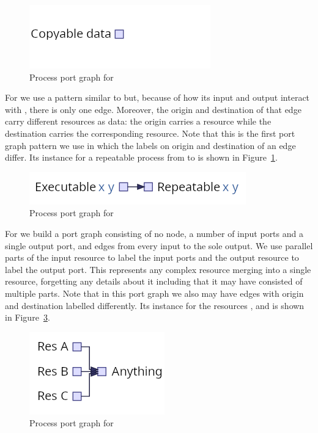 \documentclass[class=smolathesis,crop=false]{standalone}
\begin{document}
\begin{figure}[htbp]
  \centering
  \includegraphics[scale=0.5]{img/erase_port_graph.png}
  \caption{Process port graph for }
  \label{fig:erase_port_graph}
\end{figure}

For  we use a pattern similar to  but, because of how its input and output interact with , there is only one edge.
Moreover, the origin and destination of that edge carry different resources as data: the origin carries a  resource while the destination carries the corresponding  resource.
Note that this is the first port graph pattern we use in which the labels on origin and destination of an edge differ.
Its instance for a repeatable process from  to  is shown in Figure~\ref{fig:erase_port_graph}.

\begin{figure}[htbp]
  \centering
  \includegraphics[scale=0.5]{img/once_port_graph.png}
  \caption{Process port graph for }
  \label{fig:once_port_graph}
\end{figure}

For  we build a port graph consisting of no node, a number of input ports and a single output port, and edges from every input to the sole output.
We use parallel parts of the input resource to label the input ports and the output  resource to label the output port.
This represents any complex resource merging into a single  resource, forgetting any details about it including that it may have consisted of multiple parts.
Note that in this port graph we also may have edges with origin and destination labelled differently.
Its instance for the resources ,  and  is shown in Figure~\ref{fig:forget_port_graph}.

\begin{figure}[htbp]
  \centering
  \includegraphics[scale=0.5]{img/forget_port_graph.png}
  \caption{Process port graph for }
  \label{fig:forget_port_graph}
\end{figure}
\end{document}
